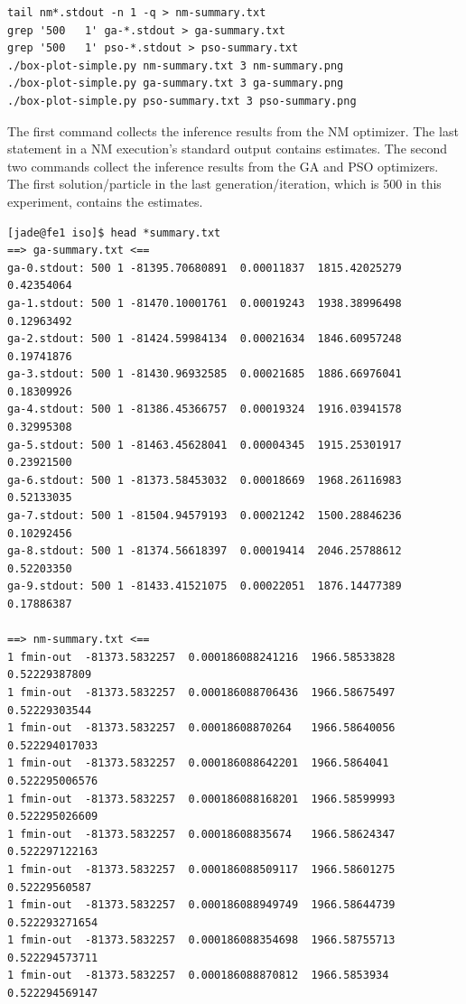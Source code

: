 \documentclass[graybox]{svmult}
\begin{document}
{\scriptsize{}\begin{verbatim}
tail nm*.stdout -n 1 -q > nm-summary.txt
grep '500   1' ga-*.stdout > ga-summary.txt
grep '500   1' pso-*.stdout > pso-summary.txt
./box-plot-simple.py nm-summary.txt 3 nm-summary.png
./box-plot-simple.py ga-summary.txt 3 ga-summary.png
./box-plot-simple.py pso-summary.txt 3 pso-summary.png
\end{verbatim}}

The first command collects the inference results from the NM optimizer.  The last statement in a NM execution's standard output contains estimates.  The second two commands collect the inference results from the GA and PSO optimizers.  The first solution/particle in the last generation/iteration, which is 500 in this experiment, contains the estimates.

{\scriptsize{}\begin{verbatim}
[jade@fe1 iso]$ head *summary.txt
==> ga-summary.txt <==
ga-0.stdout: 500 1 -81395.70680891  0.00011837  1815.42025279  0.42354064
ga-1.stdout: 500 1 -81470.10001761  0.00019243  1938.38996498  0.12963492
ga-2.stdout: 500 1 -81424.59984134  0.00021634  1846.60957248  0.19741876
ga-3.stdout: 500 1 -81430.96932585  0.00021685  1886.66976041  0.18309926
ga-4.stdout: 500 1 -81386.45366757  0.00019324  1916.03941578  0.32995308
ga-5.stdout: 500 1 -81463.45628041  0.00004345  1915.25301917  0.23921500
ga-6.stdout: 500 1 -81373.58453032  0.00018669  1968.26116983  0.52133035
ga-7.stdout: 500 1 -81504.94579193  0.00021242  1500.28846236  0.10292456
ga-8.stdout: 500 1 -81374.56618397  0.00019414  2046.25788612  0.52203350
ga-9.stdout: 500 1 -81433.41521075  0.00022051  1876.14477389  0.17886387

==> nm-summary.txt <==
1 fmin-out  -81373.5832257  0.000186088241216  1966.58533828  0.52229387809
1 fmin-out  -81373.5832257  0.000186088706436  1966.58675497  0.52229303544
1 fmin-out  -81373.5832257  0.00018608870264   1966.58640056  0.522294017033
1 fmin-out  -81373.5832257  0.000186088642201  1966.5864041   0.522295006576
1 fmin-out  -81373.5832257  0.000186088168201  1966.58599993  0.522295026609
1 fmin-out  -81373.5832257  0.00018608835674   1966.58624347  0.522297122163
1 fmin-out  -81373.5832257  0.000186088509117  1966.58601275  0.52229560587
1 fmin-out  -81373.5832257  0.000186088949749  1966.58644739  0.522293271654
1 fmin-out  -81373.5832257  0.000186088354698  1966.58755713  0.522294573711
1 fmin-out  -81373.5832257  0.000186088870812  1966.5853934   0.522294569147


\end{verbatim}}
\end{document}
